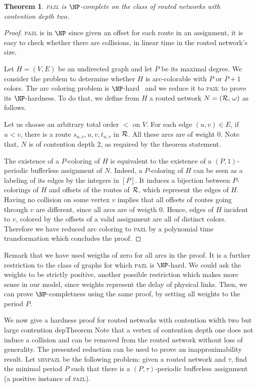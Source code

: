 \documentclass[a4paper,10pt]{article}
\newtheorem{theorem}{Theorem}
\newcommand\pazl{\textsc{pazl}\xspace}
\newcommand\minpazl{\textsc{minpazl}\xspace}
\begin{document}
 \begin{theorem}
\pazl is $\NP$-complete on the class of routed networks with contention depth two.
\end{theorem}
 \begin{proof}
 \pazl is in $\NP$ since given an offset for each route in an assignment, it is easy to check whether there are collisions, in linear time in the routed network's size.
 
  Let $H=(V,E)$ be an undirected graph and let $P$ be its maximal degree. We consider the problem to determine whether $H$ is arc-colorable with $P$ or $P+1$ colors. The arc coloring problem is $\NP$-hard~\cite{holyer1981np} and we reduce it to \pazl to prove its $\NP$-hardness. To do that, we define from $H$ a routed network $N = ({\cal R},\, \omega)$ as follows. 

  Let us choose an arbitrary total order $<$ on $V$.
  For each edge $(u,v) \in E$, if $u<v$, there is a route $s_{u,v},u,v,t_{u,v}$ in ${\cal R}$. 
  All these arcs are of weight $0$. Note that, $N$ is of contention depth $2$, as required by the theorem statement. 

  The existence of a $P$-coloring of $H$ is equivalent to the existence of a $(P,1)$-periodic bufferless assignment of $N$. Indeed, a $P$-coloring of $H$ can be seen as a labeling of its edges by the integers in $[P]$. It induces a bijection between $P$-colorings of $H$ and offsets of the routes of ${\cal R}$, which represent the edges of $H$. Having no collision on some vertex $v$ implies that all offsets of routes going through $v$ are different, since all arcs are of weigth $0$. Hence, edges of $H$ incident to $v$, colored by the offsets of a valid assignment are all of distinct colors. Therefore we have reduced arc coloring to \pazl by a polynomial time transformation which concludes the proof. 
 \end{proof}
 
 Remark that we have used weigths of zero for all arcs in the proof. It is a further restriction to the 
 class of graphs for which \pazl is $\NP$-hard. We could ask the weights to be strictly positive, another possible restriction which makes more sense in our model, since weights represent the delay of physical links. Then, we can prove $\NP$-completness using the same proof, by setting all weights to the period $P$.

We now give a hardness proof for routed networks with contention width two but large contention depTheorem Note that a vertex of contention depth one does not induce a collision and can be removed from the routed network without loss of generality. The presented reduction can be used to prove an inapproximability result. Let \minpazl be the following problem: given a routed network and $\tau$, find the minimal period $P$ such that there is a $(P,\tau)$-periodic bufferless assignment (a positive instance of \pazl). 
\end{document}
